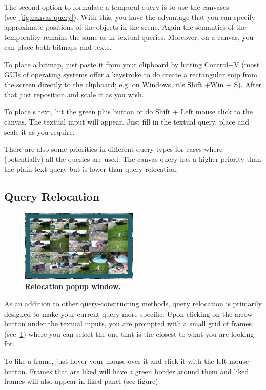 The second option to formulate a temporal query is to use the canvases (see~\cref{fig:canvas-query}). With this, you have the advantage that you can specify approximate positions of the objects in the scene. Again the semantics of the temporality remains the same as in textual queries. Moreover, on a canvas, you can place both bitmaps and texts. 

To place a bitmap, just paste it from your clipboard by hitting Control+V (most GUIs of operating systems offer a keystroke to do create a rectangular snip from the screen directly to the clipboard; e.g. on Windows, it's Shift +Win + S). After that just reposition and scale it as you wish.

To place s text, hit the green plus button or do Shift + Left mouse click to the canvas. The textual input will appear. Just fill in the textual query, place and scale it as you require.


There are also some priorities in different query types for cases where (potentially) all the queries are used. The canvas query has a higher priority than the plain text query but is lower than query relocation. 

\subsection{Query Relocation}
\begin{figure}[h]
	\centering
	\includegraphics[width=0.5\textwidth]{img/relocation.png}
  \caption{\textbf{Relocation popup window.}}
	\label{fig:relocation}
\end{figure}

As an addition to other query-constructing methods, query relocation is primarily designed to make your current query more specific. Upon clicking on the arrow button under the textual inputs, you are prompted with a small grid of frames (see~\cref{fig:relocation}) where you can select the one that is the closest to what you are looking for.


To like a frame, just hover your mouse over it and click it with the left mouse button. Frames that are liked will have a green border around them and liked frames will also appear in liked panel (see figure).


